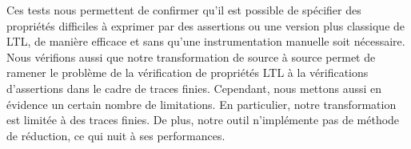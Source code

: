 Ces tests nous permettent de confirmer qu'il est possible de spécifier des
propriétés difficiles à exprimer par des assertions ou une version plus
classique de LTL, de manière efficace et sans qu'une instrumentation manuelle
soit nécessaire. Nous vérifions aussi que notre transformation de source à
source permet de ramener le problème de la vérification de propriétés LTL à la
vérifications d'assertions dans le cadre de traces finies. Cependant, nous
mettons aussi en évidence un certain nombre de limitations. En particulier,
notre transformation est limitée à des traces finies. De plus, notre outil
n'implémente pas de méthode de réduction, ce qui nuit à ses performances.